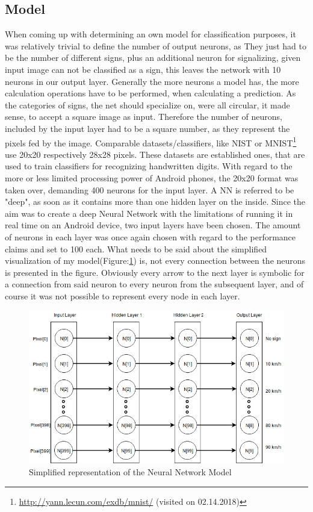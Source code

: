 \subsection{Model}
When coming up with determining an own model for classification purposes, it was relatively trivial to define the number of output neurons, as They just had to be the number of different signs, plus an additional neuron for signalizing, given input image can not be classified as a sign, this leaves the network with 10 neurons in our output layer. Generally the more neurons a model has, the more calculation operations have to be performed, when calculating a prediction.\newline
As the categories of signs, the net should specialize on, were all circular, it made sense, to accept a square image as input. Therefore the number of neurons, included by the input layer had to be a square number, as they represent the pixels fed by the image. Comparable datasets/classifiers, like NIST or MNIST\footnote{\url{http://yann.lecun.com/exdb/mnist/} (visited on 02.14.2018)} use 20x20 respectively 28x28 pixels. These datasets are established ones, that are used to train classifiers for recognizing handwritten digits. With regard to the more or less limited processing power of Android phones, the 20x20 format was taken over, demanding 400 neurons for the input layer. \newline
A NN is referred to be "deep", as soon as it contains more than one hidden layer on the inside.
Since the aim was to create a deep Neural Network with the limitations of running it in real time on an Android device, two input layers have been chosen. The amount of neurons in each layer was once again chosen with regard to the performance claims and set to 100 each.\newline
What needs to be said about the simplified visualization of my model(Figure:\ref{fig:neuralnetmodel}) is, not every connection between the neurons is presented in the figure. Obviously every arrow to the next layer is symbolic for a connection from said neuron to every neuron from the subsequent layer, and of course it was not possible to represent every node in each layer.

\begin{figure}[H]
	\centering
	\includegraphics[width=0.9\linewidth]{images/neuralnetmodel.jpg}
	\caption{Simplified representation of the Neural Network Model }\label{fig:neuralnetmodel}	
\end{figure}

